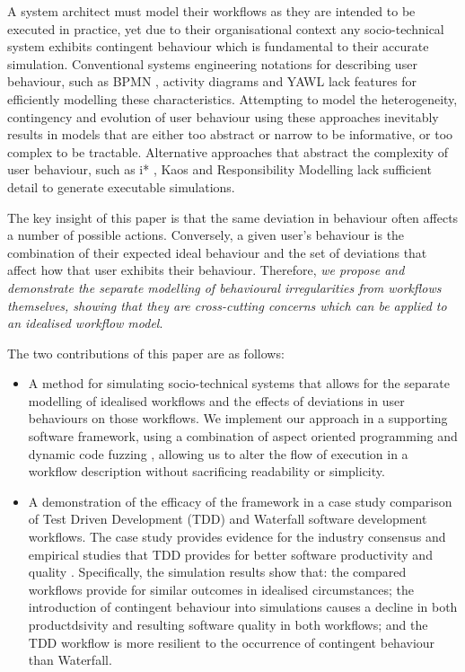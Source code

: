 \documentclass{llncs}
\begin{document}
A system architect must model their workflows as they are intended to be executed in practice, yet due to their
organisational context any socio-technical system exhibits contingent behaviour which is fundamental to their accurate
simulation. Conventional systems engineering notations for describing user behaviour, such as BPMN \citep{omg2011omgbpmn},
activity diagrams \citep{omg07omguml} and YAWL \citep{hofstede2010yawl} lack features for efficiently modelling these
characteristics.  Attempting to model the heterogeneity, contingency and evolution of user behaviour using these
approaches inevitably results in models that are either too abstract or narrow to be informative, or too complex to be
tractable.  Alternative approaches that abstract the complexity of user behaviour, such as i* \citep{yu1995social},
Kaos \citep{werneck2009goreistarkaos} and Responsibility Modelling \citep{sommerville09deriving} lack sufficient detail to
generate executable simulations.

The key insight of this paper is that the same deviation in behaviour often affects a number of possible actions.
Conversely, a given user's behaviour is the combination of their expected ideal behaviour and the set of deviations that
affect how that user exhibits their behaviour.  Therefore, \emph{we propose and demonstrate the separate
modelling of behavioural irregularities from workflows themselves, showing that they are cross-cutting concerns which can
be applied to an idealised workflow model}.

The two contributions of this paper are as follows:

\begin{itemize}

\item A method for simulating socio-technical systems that allows for the separate modelling of idealised workflows and
  the effects of deviations in user behaviours on those workflows.  We implement our approach in a supporting software
  framework, using a combination of aspect oriented programming \cite{filman01aspect} and dynamic code fuzzing
  \citep{takanen08fuzzing}, allowing us to alter the flow of execution in a
  workflow description without sacrificing readability or simplicity.

\item A demonstration of the efficacy of the framework in a case study comparison of Test Driven Development (TDD) and
  Waterfall software development workflows.  The case study provides evidence for the industry consensus and empirical
  studies that TDD provides for better software productivity and quality
  \citep{Bhat2006TestDrivenDevelopment,George2004TestDrivenDevelopment,Huang2009EmpiricalTestFirstProgramming}.    Specifically, the simulation results show that: the
  compared workflows provide for similar outcomes in idealised circumstances; the introduction of contingent behaviour
  into simulations causes a decline in both productdsivity and resulting software quality in both workflows; and the TDD
  workflow is more resilient to the occurrence of contingent behaviour than Waterfall.

\end{itemize}
\end{document}
